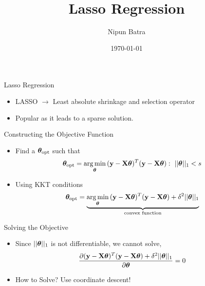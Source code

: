 \documentclass{beamer}
\title{Lasso Regression}
\date{\today}
\author{Nipun Batra}
\institute{IIT Gandhinagar}
\begin{document}
  \maketitle
  
  
  
  

\begin{frame}{Lasso Regression}
\begin{itemize}[<+->]
	
	
	\item LASSO $\longrightarrow$ Least absolute shrinkage and selection operator
	\item Popular as it leads to a sparse solution.
	
\end{itemize}
\end{frame}

\begin{frame}{Constructing the Objective Function}
\begin{itemize}[<+->]

\item Find a $\boldsymbol{\theta}_{\text{opt}}$ such that  \begin{equation}    \vtheta_{\text{opt}} =  \argmin_{\vtheta} {(\vy-\mX\vtheta)^T(\vy-\mX\vtheta)} : \ ||\vtheta||_1<s \end{equation}
\item Using KKT conditions
\begin{equation}
    \boldsymbol{\theta}_{\text{opt}} = \underbrace{\operatorname*{arg\,min}_{\boldsymbol{\theta}}{(\mathbf{y}-\mathbf{X}\boldsymbol{\theta})^T(\mathbf{y}-\mathbf{X}\boldsymbol{\theta}) + \delta^2||\boldsymbol{\theta}||_1}}_\text{convex function}
\end{equation}
	
\end{itemize}


\end{frame}

\begin{frame}{Solving the Objective}
\begin{itemize}[<+->]

\item Since $||\boldsymbol{\theta}||_1$ is not differentiable, we cannot solve,  \begin{equation}    \frac{\partial {(\mathbf{y}-\mathbf{X}\boldsymbol{\theta})^T(\mathbf{y}-\mathbf{X}\boldsymbol{\theta}) + \delta^2||\boldsymbol{\theta}||_1}}{\partial \boldsymbol{\theta}} = 0 \end{equation}

\item How to Solve?
Use coordinate descent!
\end{itemize}

\end{frame}
\end{document}
